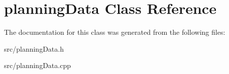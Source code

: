 \hypertarget{classplanningData}{\section{planning\+Data Class Reference}
\label{classplanningData}
}


The documentation for this class was generated from the following files\+:\begin{DoxyCompactItemize}
\item 
src/planning\+Data.\+h\item 
src/planning\+Data.\+cpp\end{DoxyCompactItemize}
